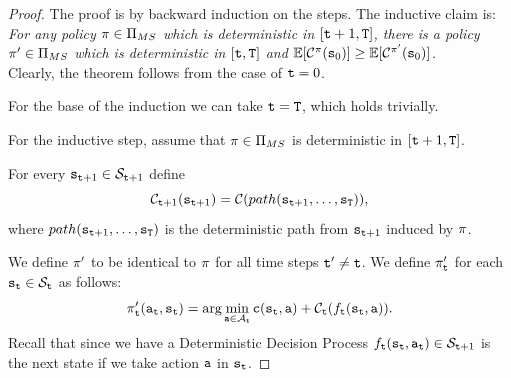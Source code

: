 \begin{proof}
The proof is by backward induction on the steps. The inductive claim is:\\
{\em For any policy $\pi\in \Pi_{MS}$ which is deterministic in
$[{\tt t}+1,{\tt T}]$, there is a policy $\pi'\in \Pi_{MS}$
which is deterministic in $[{\tt t},{\tt T}]$ and
$\mathbb{E}[\mathcal{C}^\pi({\tt s}_0)]\geq
\mathbb{E}[\mathcal{C}^{\pi'}({\tt s}_0)]$.}\\
Clearly, the theorem follows from the case of ${\tt t}=0$.

For the base of the induction we can take ${\tt t}={\tt T}$, which
holds trivially.

For the inductive step, assume that $\pi\in \Pi_{MS}$ is
deterministic in $[{\tt t}+1,{\tt T}]$.


For every ${\tt s}_{{\tt t}+1}\in \mathcal{S}_{{\tt t}+1}$ define
\[
\mathcal{C}_{{\tt t}+1}({\tt s}_{{\tt t}+1})=\mathcal{C}(path({\tt s}_{{\tt t}+1},
\dots , {\tt s}_{\tt T})),
\]
where $path({\tt s}_{{\tt t}+1}, \dots , {\tt s}_{\tt T})$ is the
deterministic path from ${\tt s}_{{\tt t}+1}$ induced by $\pi$.

We define $\pi'$ to be identical to $\pi$ for all time steps
${\tt t}'\neq {\tt t}$. We define $\pi'_{\tt t}$ for each
${\tt s}_{\tt t}\in \mathcal{S}_{\tt t}$ as follows:
\begin{equation}
\label{eq:sec2-MS-MD}
\pi'_{\tt t}({\tt a}_{\tt t},{\tt s}_{\tt t})=\arg\min_{{\tt a}\in
\mathcal{A}_{\tt t}} {\tt c}({\tt s}_{\tt t},{\tt a})+
\mathcal{C}_{{\tt t}}(f_{\tt t}({\tt s}_{\tt t},{\tt a})).
\end{equation}
Recall that since we have a Deterministic Decision Process
$f_{\tt t}({\tt s}_{\tt t},{\tt a}_{\tt t})\in \mathcal{S}_{{\tt t}+1}$ is
the next state if we take action ${\tt a}$ in ${\tt s}_{\tt t}$.


\end{proof}

